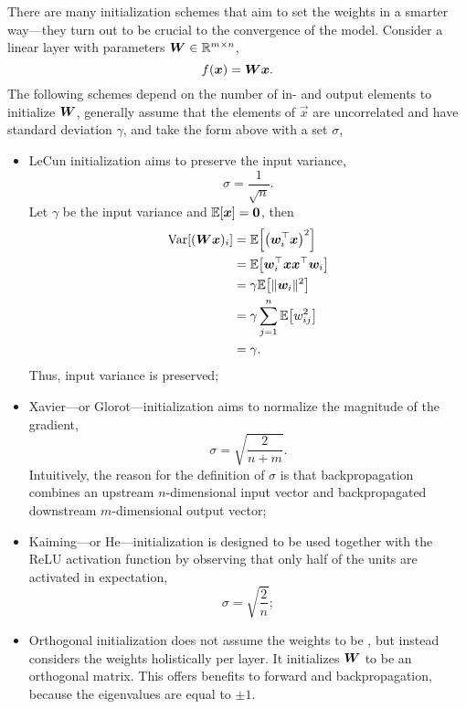 There are many initialization schemes that aim to set the weights in a smarter way---they turn out
to be crucial to the convergence of the model. Consider a linear layer with parameters $\bm{W} \in
    \mathbb{R}^{m \times n}$, \[
    f(\bm{x}) = \bm{W} \bm{x}.
\]
The following schemes depend on the number of in- and output elements to initialize
$\bm{W}$, generally
assume that the elements of $\vec{x}$ are uncorrelated and have standard deviation $\gamma$, and
take the form above with a set $\sigma$,
\begin{itemize}
    \item LeCun initialization \citep{lecun2002efficient} aims to preserve the input variance, \[
              \sigma = \frac{1}{\sqrt{n}}.
          \]
          Let $\gamma$ be the input variance and $\mathbb{E}[\bm{x}] = \bm{0}$, then
          \begin{align*}
              \Var[(\mat{W} \vec{x})_i] & = \E \lft[ \lft( \transpose{\vec{w}_i} \vec{x} \rgt)^2 \rgt]                 \\
                                        & = \E \lft[ \transpose{\vec{w}_i} \vec{x} \transpose{\vec{x}} \vec{w}_i \rgt] \\
                                        & = \gamma \E \lft[ \| \vec{w}_i \|^2 \rgt]                                    \\
                                        & = \gamma \sum_{j=1}^{n} \E\lft[w_{ij}^2\rgt]                                 \\
                                        & = \gamma.
          \end{align*}
          Thus, input variance is preserved;

    \item Xavier---or Glorot---initialization \citep{glorot2010understanding} aims to normalize the magnitude
          of the gradient, \[
              \sigma = \sqrt{\frac{2}{n+m}}.
          \]
          Intuitively, the reason for the definition of $\sigma$ is that backpropagation combines an upstream
          $n$-dimensional input vector and backpropagated downstream $m$-dimensional output vector;

    \item Kaiming---or He---initialization \citep{he2015delving} is designed to be used together with the
          ReLU activation function by observing that only half of the units are activated in expectation, \[
              \sigma = \sqrt{\frac{2}{n}};
          \]
    \item Orthogonal initialization \citep{saxe2013exact,hu2020provable} does not assume the weights to be
          \iid, but instead considers the weights holistically per layer. It initializes $\bm{W}$ to be an
          orthogonal matrix. This offers benefits to forward and backpropagation, because the eigenvalues are
          equal to $\pm 1$.
\end{itemize}

